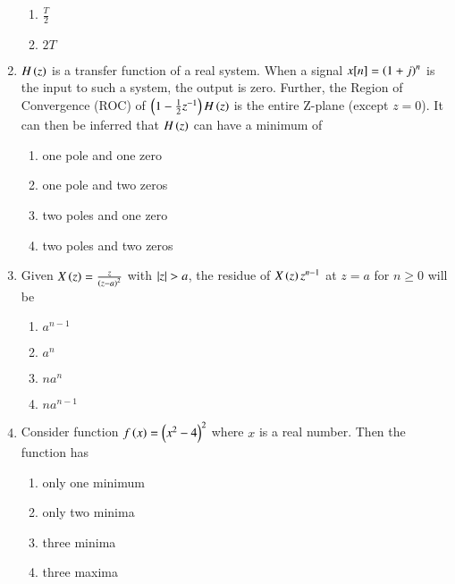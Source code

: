 \documentclass[journal,12pt,onecolumn]{IEEEtran}
\theoremstyle{remark}
\begin{document}
\begin{enumerate}
\begin{enumerate}
          \item $\frac{T}{2}$
          \item $2T$
      \end{enumerate}
      \item $H\left(z\right)$ is a transfer function of a real system. When a signal $x[n]=\left(1+j\right)^n$ is the input to such a system, the output is zero. Further, the Region of Convergence (ROC) of $\left(1-\frac{1}{2}z^{-1}\right)H\left(z\right)$ is the entire Z-plane (except $z=0$). It can then be inferred that $H\left(z\right)$ can have a minimum of
      \begin{enumerate}
          \item one pole and one zero
          \item one pole and two zeros
          \item two poles and one zero
          \item two poles and two zeros
      \end{enumerate}
      \item Given $X\left(z\right)=\frac{z}{\left(z-a\right)^2}$ with $\left\vert z\right\vert>a$, the residue of $X\left(z\right)z^{n-1}$ at $z=a$ for $n\geq 0$ will be
      \begin{enumerate}
          \item $a^{n-1}$
          \item $a^n$
          \item $n a^n$
          \item $na^{n-1}$
      \end{enumerate}
      \item Consider function $f\left(x\right)=\left(x^2-4\right)^2$ where $x$  is a real number. Then the function has
      \begin{enumerate}
          \item only one minimum
          \item only two minima
          \item three minima
          \item three maxima
      \end{enumerate}
\end{enumerate}
\end{document}
